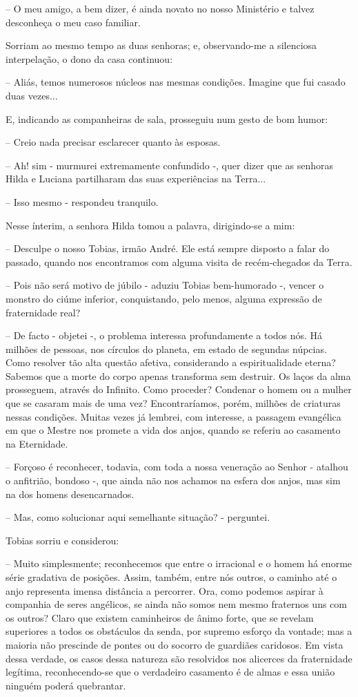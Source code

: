 \documentclass[portuguese,12pt,a4paper]{scrbook}
\begin{document}
	– O meu amigo, a bem dizer, é ainda novato no nosso Ministério e talvez desconheça o meu caso familiar.
	
	Sorriam ao mesmo tempo as duas senhoras; e, observando-me a silenciosa interpelação, o dono da casa continuou:
	
	– Aliás, temos numerosos núcleos nas mesmas condições. Imagine que fui casado duas vezes...
	
	E, indicando as companheiras de sala, prosseguiu num gesto de bom humor:
	
	– Creio nada precisar esclarecer quanto às esposas.
	
	– Ah! sim - murmurei extremamente confundido -, quer dizer que as senhoras Hilda e Luciana partilharam das suas experiências na Terra...
	
	– Isso mesmo - respondeu tranquilo.
	
	Nesse ínterim, a senhora Hilda tomou a palavra, dirigindo-se a mim:
	
	– Desculpe o nosso Tobias, irmão André. Ele está sempre disposto a falar do passado, quando nos encontramos com alguma visita de recém-chegados da Terra.
	
	– Pois não será motivo de júbilo - aduziu Tobias bem-humorado -, vencer o monstro do ciúme inferior, conquistando, pelo menos, alguma expressão de fraternidade real?
	
	– De facto - objetei -, o problema interessa profundamente a todos nós. Há milhões de pessoas, nos círculos do planeta, em estado de segundas núpcias. Como resolver tão alta questão afetiva, considerando a espiritualidade eterna? Sabemos que a morte do corpo apenas transforma sem destruir. Os laços da alma prosseguem, através do Infinito. Como proceder? Condenar o homem ou a mulher que se casaram mais de uma vez? Encontraríamos, porém, milhões de criaturas nessas condições. Muitas vezes já lembrei, com interesse, a passagem evangélica em que o Mestre nos promete a vida dos anjos, quando se referiu ao casamento na Eternidade.
	
	– Forçoso é reconhecer, todavia, com toda a nossa veneração ao Senhor - atalhou o anfitrião, bondoso -, que ainda não nos achamos na esfera dos anjos, mas sim na dos homens desencarnados.
	
	– Mas, como solucionar aqui semelhante situação? - perguntei.
	
	Tobias sorriu e considerou:
	
	– Muito simplesmente; reconhecemos que entre o irracional e o homem há enorme série gradativa de posições. Assim, também, entre nós outros, o caminho até o anjo representa imensa distância a percorrer. Ora, como podemos aspirar à companhia de seres angélicos, se ainda não somos nem mesmo fraternos uns com os outros? Claro que existem caminheiros de ânimo forte, que se revelam superiores a todos os obstáculos da senda, por supremo esforço da vontade; mas a maioria não prescinde de pontes ou do socorro de guardiães caridosos. Em vista dessa verdade, os casos dessa natureza são resolvidos nos alicerces da fraternidade legítima, reconhecendo-se que o verdadeiro casamento é de almas e essa união ninguém poderá quebrantar.
	
\end{document}
